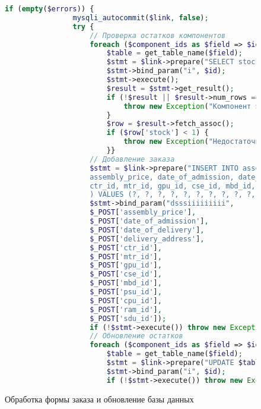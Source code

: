 \begin{figure}[ht]
	\begin{lstlisting}[language=Php]
			if (empty($errors)) {
				mysqli_autocommit($link, false);				
				try {
					// Проверка остатков компонентов
					foreach ($component_ids as $field => $id) {
						$table = get_table_name($field);
						$stmt = $link->prepare("SELECT stock FROM $table WHERE ".get_id_column($table)." = ? FOR UPDATE");
						$stmt->bind_param("i", $id);
						$stmt->execute();
						$result = $stmt->get_result();						
						if (!$result || $result->num_rows === 0) {
							throw new Exception("Компонент $table не найден");
						}						
						$row = $result->fetch_assoc();
						if ($row['stock'] < 1) {
							throw new Exception("Недостаточно $table на складе");
						}}					
					// Добавление заказа
					$stmt = $link->prepare("INSERT INTO assembly (
					assembly_price, date_of_admission, date_of_delivery, delivery_address,
					ctr_id, mtr_id, gpu_id, cse_id, mbd_id, psu_id, cpu_id, ram_id, sdu_id
					) VALUES (?, ?, ?, ?, ?, ?, ?, ?, ?, ?, ?, ?, ?)");					
					$stmt->bind_param("dsssiiiiiiiii",
					$_POST['assembly_price'],
					$_POST['date_of_admission'],
					$_POST['date_of_delivery'],
					$_POST['delivery_address'],
					$_POST['ctr_id'],
					$_POST['mtr_id'],
					$_POST['gpu_id'],
					$_POST['cse_id'],
					$_POST['mbd_id'],
					$_POST['psu_id'],
					$_POST['cpu_id'],
					$_POST['ram_id'],
					$_POST['sdu_id']);	
					if (!$stmt->execute()) throw new Exception("Ошибка оформления: ".$stmt->error);
					// Обновление остатков
					foreach ($component_ids as $field => $id) {
						$table = get_table_name($field);
						$stmt = $link->prepare("UPDATE $table SET stock = stock - 1 WHERE ".get_id_column($table)." = ?");
						$stmt->bind_param("i", $id);
						if (!$stmt->execute()) throw new Exception("Ошибка обновления: ".$stmt->error);}
	\end{lstlisting}
\caption{Обработка формы заказа и обновление базы данных}
\label{fig:orderform_part3}
\end{figure}

\clearpage
{}\fi
